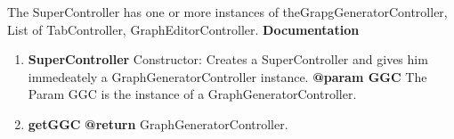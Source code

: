 The SuperController has one or more instances of theGrapgGeneratorController, List of TabController, GraphEditorController. \newline
\textbf{Documentation}
\begin{enumerate}[+]
	\item{
	\textbf{SuperController} \newline
	Constructor: Creates a SuperController and gives him immedeately a GraphGeneratorController instance.  \newline
	\textbf{@param GGC} The Param GGC is the instance of a GraphGeneratorController. \newline
	}

	\item{
	\textbf{getGGC} \newline
	\textbf{@return} GraphGeneratorController. \newline

}
\end{enumerate}
